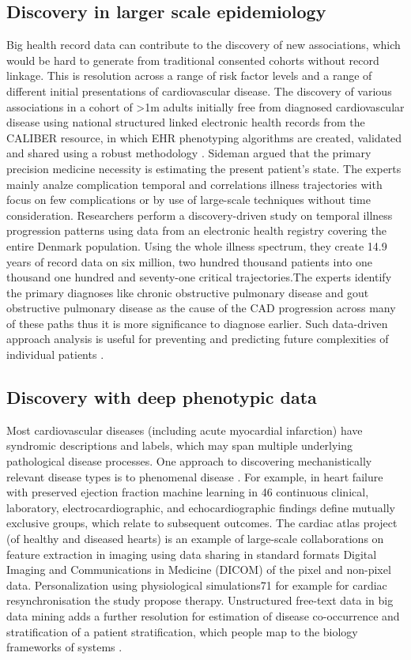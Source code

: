 \documentclass[sigconf]{acmart}
\begin{document}
\subsection{Discovery in larger scale epidemiology}
Big health record data can contribute to the discovery of new associations, which would be hard to generate from traditional consented cohorts without record linkage.  This is resolution across a range of risk factor levels and a range of different initial presentations of cardiovascular disease. The discovery of various associations in a cohort of >1m adults initially free from diagnosed cardiovascular disease using national structured linked electronic health records from the CALIBER resource, in which EHR phenotyping algorithms are created, validated and shared using a robust methodology \cite{wang2005framingham}.
Sideman \cite{sideman1985simulation}argued that the primary precision medicine necessity is estimating the present patient's state. The experts mainly analze complication temporal and correlations illness trajectories with focus on few complications or by use of large-scale techniques without time consideration. Researchers perform a discovery-driven study on temporal illness progression patterns using data from an electronic health registry covering the entire Denmark population. Using the whole illness spectrum, they create 14.9 years of record data on six million, two hundred thousand patients into one thousand one hundred and seventy-one critical trajectories.The experts identify the primary diagnoses like chronic obstructive pulmonary disease and gout obstructive pulmonary disease as the cause of the CAD progression across many of these paths thus it is more significance to diagnose earlier. Such data-driven approach analysis is useful for preventing and predicting future complexities of individual patients \cite{sideman1985simulation}.

\subsection{Discovery with deep phenotypic data}
Most cardiovascular diseases (including acute myocardial infarction) have syndromic descriptions and labels, which may span multiple underlying pathological disease processes. One approach to discovering mechanistically relevant disease types is to phenomenal disease \cite{sahaf2011comparing}. For example, in heart failure with preserved ejection fraction machine learning in 46 continuous clinical, laboratory, electrocardiographic, and echocardiographic findings define mutually exclusive groups, which relate to subsequent outcomes. The cardiac atlas project (of healthy and diseased hearts) is an example of large-scale collaborations on feature extraction in imaging using data sharing in standard formats Digital Imaging and Communications in Medicine (DICOM) of the pixel and non-pixel data. Personalization using physiological simulations71 for example for cardiac resynchronisation the study propose therapy. Unstructured free-text data in big data mining adds a further resolution for estimation of disease co-occurrence and stratification of a patient stratification, which people map to the biology frameworks of systems \cite{sahaf2011comparing}.
\end{document}
